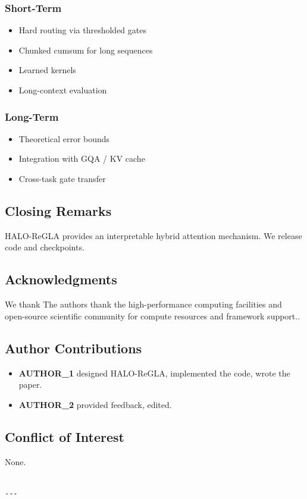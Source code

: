 \subsubsection{Short-Term}
\begin{itemize}
\item Hard routing via thresholded gates
\item Chunked cumsum for long sequences
\item Learned kernels
\item Long-context evaluation

\end{itemize}
\subsubsection{Long-Term}
\begin{itemize}
\item Theoretical error bounds
\item Integration with GQA / KV cache
\item Cross-task gate transfer

\end{itemize}
\subsection{Closing Remarks}

HALO-ReGLA provides an interpretable hybrid attention mechanism. We release 
code and checkpoints.

\subsection{Acknowledgments}

We thank The authors thank the high-performance computing facilities and open-source scientific community for compute resources and framework support..

\subsection{Author Contributions}

\begin{itemize}
\item \textbf{{{AUTHOR\_1}}} designed HALO-ReGLA, implemented the code, wrote the paper.
\item \textbf{{{AUTHOR\_2}}} provided feedback, edited.

\end{itemize}
\subsection{Conflict of Interest}

None.
\begin{lstlisting}

---
\end{lstlisting}